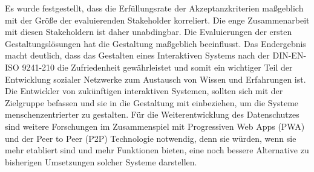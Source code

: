 Es wurde festgestellt, dass die Erfüllungsrate der Akzeptanzkriterien maßgeblich mit der Größe der evaluierenden Stakeholder korreliert. Die enge Zusammenarbeit mit diesen Stakeholdern ist daher unabdingbar. Die Evaluierungen der ersten Gestaltungslösungen hat die Gestaltung maßgeblich beeinflusst. Das Endergebnis macht deutlich, dass das Gestalten eines Interaktiven Systems nach der DIN-EN-ISO 9241-210 die Zufriedenheit gewährleistet und somit ein wichtiger Teil der Entwicklung sozialer Netzwerke zum Austausch von Wissen und Erfahrungen ist. \\

Die Entwickler von zukünftigen interaktiven Systemen, sollten sich mit der Zielgruppe befassen und sie in die Gestaltung mit einbeziehen, um die Systeme menschenzentrierter zu gestalten. Für die Weiterentwicklung des Datenschutzes sind weitere Forschungen im Zusammenspiel mit Progressiven Web Apps (PWA) und der Peer to Peer (P2P) Technologie notwendig, denn sie würden, wenn sie mehr etabliert sind und mehr Funktionen bieten, eine noch bessere Alternative zu bisherigen Umsetzungen solcher Systeme darstellen. \\


